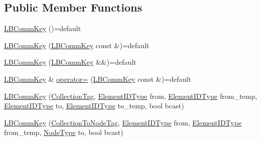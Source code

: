 \subsection*{Public Member Functions}
\begin{DoxyCompactItemize}
\item 
\hyperlink{structvt_1_1vrt_1_1collection_1_1balance_1_1_l_b_comm_key_a0de8943d958aa8cb66822cbe146e9436}{L\+B\+Comm\+Key} ()=default
\item 
\hyperlink{structvt_1_1vrt_1_1collection_1_1balance_1_1_l_b_comm_key_a63ddb8268773add0bda41a902e0028a8}{L\+B\+Comm\+Key} (\hyperlink{structvt_1_1vrt_1_1collection_1_1balance_1_1_l_b_comm_key}{L\+B\+Comm\+Key} const \&)=default
\item 
\hyperlink{structvt_1_1vrt_1_1collection_1_1balance_1_1_l_b_comm_key_a7b36d60c23c02ab4b111e56fbd7ced05}{L\+B\+Comm\+Key} (\hyperlink{structvt_1_1vrt_1_1collection_1_1balance_1_1_l_b_comm_key}{L\+B\+Comm\+Key} \&\&)=default
\item 
\hyperlink{structvt_1_1vrt_1_1collection_1_1balance_1_1_l_b_comm_key}{L\+B\+Comm\+Key} \& \hyperlink{structvt_1_1vrt_1_1collection_1_1balance_1_1_l_b_comm_key_af4941d7eb050ab8cd98a163218cb98f5}{operator=} (\hyperlink{structvt_1_1vrt_1_1collection_1_1balance_1_1_l_b_comm_key}{L\+B\+Comm\+Key} const \&)=default
\item 
\hyperlink{structvt_1_1vrt_1_1collection_1_1balance_1_1_l_b_comm_key_a11e0453d7500723cb30e197d28aa9aa9}{L\+B\+Comm\+Key} (\hyperlink{structvt_1_1vrt_1_1collection_1_1balance_1_1_l_b_comm_key_1_1_collection_tag}{Collection\+Tag}, \hyperlink{namespacevt_1_1vrt_1_1collection_1_1balance_a14c8d2c972f2913aa3f1636e5be0a120}{Element\+I\+D\+Type} from, \hyperlink{namespacevt_1_1vrt_1_1collection_1_1balance_a14c8d2c972f2913aa3f1636e5be0a120}{Element\+I\+D\+Type} from\+\_\+temp, \hyperlink{namespacevt_1_1vrt_1_1collection_1_1balance_a14c8d2c972f2913aa3f1636e5be0a120}{Element\+I\+D\+Type} to, \hyperlink{namespacevt_1_1vrt_1_1collection_1_1balance_a14c8d2c972f2913aa3f1636e5be0a120}{Element\+I\+D\+Type} to\+\_\+temp, bool bcast)
\item 
\hyperlink{structvt_1_1vrt_1_1collection_1_1balance_1_1_l_b_comm_key_a34c069e516c26566d41329816418b03a}{L\+B\+Comm\+Key} (\hyperlink{structvt_1_1vrt_1_1collection_1_1balance_1_1_l_b_comm_key_1_1_collection_to_node_tag}{Collection\+To\+Node\+Tag}, \hyperlink{namespacevt_1_1vrt_1_1collection_1_1balance_a14c8d2c972f2913aa3f1636e5be0a120}{Element\+I\+D\+Type} from, \hyperlink{namespacevt_1_1vrt_1_1collection_1_1balance_a14c8d2c972f2913aa3f1636e5be0a120}{Element\+I\+D\+Type} from\+\_\+temp, \hyperlink{namespacevt_a866da9d0efc19c0a1ce79e9e492f47e2}{Node\+Type} to, bool bcast)

\end{DoxyCompactItemize}
